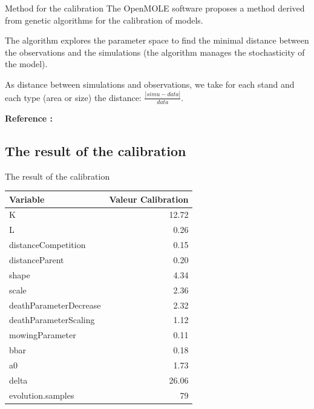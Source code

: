 \documentclass{myBeamer}
\begin{document}
\begin{frame}{Method for the calibration}
The OpenMOLE software proposes a method derived from genetic algorithms for the calibration of models.

\bigbreak
The algorithm explores the parameter space to find the minimal distance between the observations and the simulations (the algorithm manages the stochasticity of the model).
\bigbreak

As distance between simulations and observations, we take for each stand and each type (area or size) the distance: $ \frac{ | simu - data |}{ data}$.

\begin{figure}[H] 
\end{figure}

\textbf{Reference :} \cite{Reuillon2013}
\end{frame}



\subsection*{The result of the calibration}

\begin{frame}{The result of the calibration}
\
\begin{tabular}{lr}
	\hline
     Variable			    &   Valeur Calibration    \\  
   	\hline
		K						&	12.72	\\	
		L						&	0.26	\\	
		distanceCompetition		&	0.15	\\	
		distanceParent			&	0.20	\\	
		shape					&	4.34	\\	
		scale					&	2.36	\\	
		deathParameterDecrease	&	2.32	\\	
		deathParameterScaling	&	1.12	\\	
		mowingParameter			&	0.11	\\	
		bbar					&	0.18	\\	
		a0						&	1.73	\\	
		delta					&	26.06	\\	
		evolution.samples		&	79		\\	
     \hline                                   
\end{tabular}

\end{frame}
\end{document}
